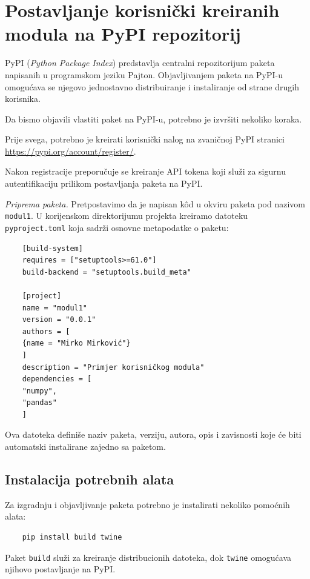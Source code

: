 \section{Postavljanje korisnički kreiranih modula na PyPI repozitorij}

PyPI (\textit{Python Package Index}) predstavlja centralni repozitorijum paketa napisanih u programskom jeziku Pajton. Objavljivanjem paketa na PyPI-u omogućava se njegovo jednostavno distribuiranje i instaliranje od strane drugih korisnika.

Da bismo objavili vlastiti paket na PyPI-u, potrebno je izvršiti nekoliko koraka.

Prije svega, potrebno je kreirati korisnički nalog na zvaničnoj PyPI stranici \url{https://pypi.org/account/register/}. 


Nakon registracije preporučuje se kreiranje API tokena koji služi za sigurnu autentifikaciju prilikom postavljanja paketa na PyPI.

\textit{Priprema paketa.} Pretpostavimo da je napisan k\^od u okviru paketa pod nazivom \texttt{modul1}. U korijenskom direktorijumu projekta kreiramo datoteku \texttt{pyproject.toml} koja sadrži osnovne metapodatke o paketu:

\begin{verbatim}
	[build-system]
	requires = ["setuptools>=61.0"]
	build-backend = "setuptools.build_meta"
	
	[project]
	name = "modul1"
	version = "0.0.1"
	authors = [
	{name = "Mirko Mirković"}
	]
	description = "Primjer korisničkog modula"
	dependencies = [
	"numpy",
	"pandas"
	]
\end{verbatim}

Ova datoteka definiše naziv paketa, verziju, autora, opis i zavisnosti koje će biti automatski instalirane zajedno sa paketom.

\subsection*{Instalacija potrebnih alata}

Za izgradnju i objavljivanje paketa potrebno je instalirati nekoliko pomoćnih alata:

\begin{verbatim}
	pip install build twine
\end{verbatim}

Paket \texttt{build} služi za kreiranje distribucionih datoteka, dok \texttt{twine} omogućava njihovo postavljanje na PyPI.

